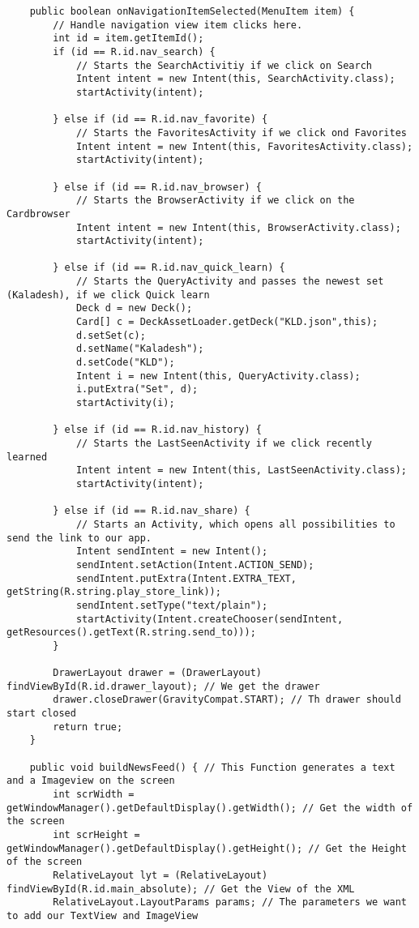 \begin{lstlisting}
    public boolean onNavigationItemSelected(MenuItem item) {
        // Handle navigation view item clicks here.
        int id = item.getItemId();
        if (id == R.id.nav_search) {
            // Starts the SearchActivitiy if we click on Search
            Intent intent = new Intent(this, SearchActivity.class);
            startActivity(intent);

        } else if (id == R.id.nav_favorite) {
            // Starts the FavoritesActivity if we click ond Favorites
            Intent intent = new Intent(this, FavoritesActivity.class);
            startActivity(intent);

        } else if (id == R.id.nav_browser) {
            // Starts the BrowserActivity if we click on the Cardbrowser
            Intent intent = new Intent(this, BrowserActivity.class);
            startActivity(intent);

        } else if (id == R.id.nav_quick_learn) {
            // Starts the QueryActivity and passes the newest set (Kaladesh), if we click Quick learn
            Deck d = new Deck();
            Card[] c = DeckAssetLoader.getDeck("KLD.json",this);
            d.setSet(c);
            d.setName("Kaladesh");
            d.setCode("KLD");
            Intent i = new Intent(this, QueryActivity.class);
            i.putExtra("Set", d);
            startActivity(i);

        } else if (id == R.id.nav_history) {
            // Starts the LastSeenActivity if we click recently learned
            Intent intent = new Intent(this, LastSeenActivity.class);
            startActivity(intent);

        } else if (id == R.id.nav_share) {
            // Starts an Activity, which opens all possibilities to send the link to our app.
            Intent sendIntent = new Intent();
            sendIntent.setAction(Intent.ACTION_SEND);
            sendIntent.putExtra(Intent.EXTRA_TEXT, getString(R.string.play_store_link));
            sendIntent.setType("text/plain");
            startActivity(Intent.createChooser(sendIntent, getResources().getText(R.string.send_to)));
        }

        DrawerLayout drawer = (DrawerLayout) findViewById(R.id.drawer_layout); // We get the drawer
        drawer.closeDrawer(GravityCompat.START); // Th drawer should start closed
        return true;
    }

    public void buildNewsFeed() { // This Function generates a text and a Imageview on the screen
        int scrWidth = getWindowManager().getDefaultDisplay().getWidth(); // Get the width of the screen
        int scrHeight = getWindowManager().getDefaultDisplay().getHeight(); // Get the Height of the screen
        RelativeLayout lyt = (RelativeLayout) findViewById(R.id.main_absolute); // Get the View of the XML
        RelativeLayout.LayoutParams params; // The parameters we want to add our TextView and ImageView


\end{lstlisting}
